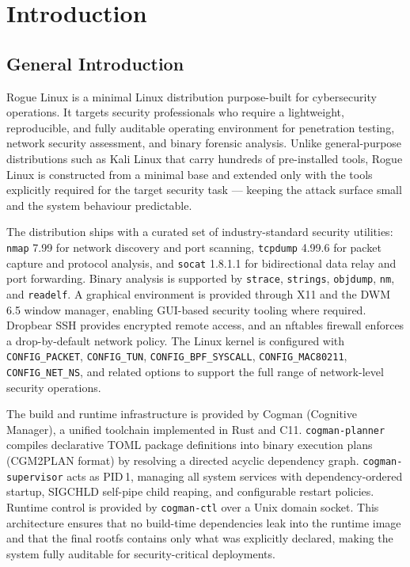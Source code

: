 \documentclass[12pt,a4paper]{report}
\begin{document}
\clearpage
{}

\chapter{Introduction}

\section{General Introduction}

Rogue Linux is a minimal Linux distribution purpose-built for cybersecurity
operations. It targets security professionals who require a lightweight,
reproducible, and fully auditable operating environment for penetration testing,
network security assessment, and binary forensic analysis. Unlike general-purpose
distributions such as Kali Linux that carry hundreds of pre-installed tools,
Rogue Linux is constructed from a minimal base and extended only with the tools
explicitly required for the target security task --- keeping the attack surface
small and the system behaviour predictable.

The distribution ships with a curated set of industry-standard security
utilities: \texttt{nmap} 7.99 for network discovery and port scanning,
\texttt{tcpdump} 4.99.6 for packet capture and protocol analysis, and
\texttt{socat} 1.8.1.1 for bidirectional data relay and port forwarding.
Binary analysis is supported by \texttt{strace}, \texttt{strings},
\texttt{objdump}, \texttt{nm}, and \texttt{readelf}. A graphical environment
is provided through X11 and the DWM 6.5 window manager, enabling GUI-based
security tooling where required. Dropbear SSH provides encrypted remote
access, and an nftables firewall enforces a drop-by-default network policy.
The Linux kernel is configured with \texttt{CONFIG\_PACKET},
\texttt{CONFIG\_TUN}, \texttt{CONFIG\_BPF\_SYSCALL}, \texttt{CONFIG\_MAC80211},
\texttt{CONFIG\_NET\_NS}, and related options to support the full range of
network-level security operations.

The build and runtime infrastructure is provided by Cogman (Cognitive Manager),
a unified toolchain implemented in Rust and C11. \texttt{cogman-planner} compiles
declarative TOML package definitions into binary execution plans (CGM2PLAN format)
by resolving a directed acyclic dependency graph. \texttt{cogman-supervisor} acts
as PID\,1, managing all system services with dependency-ordered startup, SIGCHLD
self-pipe child reaping, and configurable restart policies. Runtime control is
provided by \texttt{cogman-ctl} over a Unix domain socket. This architecture
ensures that no build-time dependencies leak into the runtime image and that
the final rootfs contains only what was explicitly declared, making the system
fully auditable for security-critical deployments.
\end{document}

